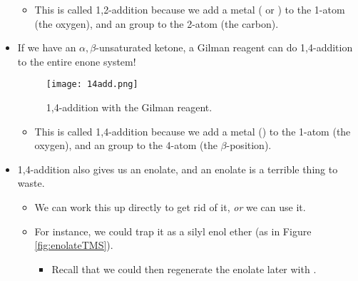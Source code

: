 \documentclass[../notes.tex]{subfiles}
\begin{document}
\begin{itemize}
\begin{itemize}
        \item This is called 1,2-addition because we add a metal ( or ) to the 1-atom (the oxygen), and an  group to the 2-atom (the carbon).
    \end{itemize}
    \item If we have an $\alpha,\beta$-unsaturated ketone, a Gilman reagent can do 1,4-addition to the entire enone system!
    \begin{figure}[h!]
        \centering
        \texttt{[image: 14add.png]}
        \caption{1,4-addition with the Gilman reagent.}
        \label{fig:14add}
    \end{figure}
    \begin{itemize}
        \item This is called 1,4-addition because we add a metal () to the 1-atom (the oxygen), and an  group to the 4-atom (the $\beta$-position).
    \end{itemize}
    \item 1,4-addition also gives us an enolate, and an enolate is a terrible thing to waste.
    \begin{itemize}
        \item We can work this up directly to get rid of it, \emph{or} we can use it.
        \item For instance, we could trap it as a silyl enol ether (as in Figure \ref{fig:enolateTMS}).
        \begin{itemize}
            \item Recall that we could then regenerate the enolate later with .
        \end{itemize}
    \end{itemize}
\end{itemize}
\end{document}
